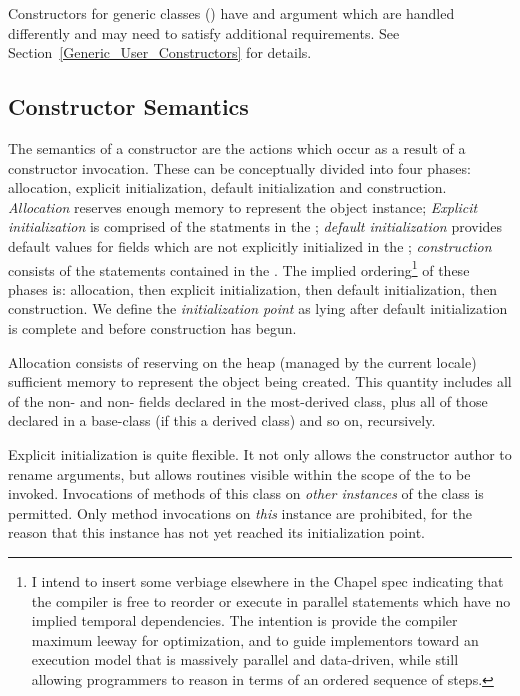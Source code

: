Constructors for generic classes () have 
and  argument which are handled differently and may need to satisfy
additional requirements. See Section~\ref{Generic_User_Constructors} for
details.  

\subsection{Constructor Semantics}
\label{Constructor_Semantics}

The semantics of a constructor are the actions which occur as a result of a
constructor invocation.  These can be conceptually divided
into four phases: allocation, explicit initialization, default initialization and
construction.  \emph{Allocation} reserves enough memory to represent the object
instance; \emph{Explicit initialization} is comprised of the statments in
the ; \emph{default initialization} provides
default values for fields which are not explicitly initialized in
the ; \emph{construction} consists of the
statements contained in the .  
The implied ordering\footnote{I intend to insert some verbiage elsewhere in the
Chapel spec indicating that the compiler is free to reorder or execute in
parallel statements which have no implied temporal dependencies.  The intention
is provide the compiler maximum leeway for optimization, and to guide
implementors toward an execution model that is massively parallel and
data-driven, while still allowing programmers to reason in terms of an ordered
sequence of steps.} of these phases is: allocation, then explicit
initialization, then default initialization, then construction.  We define the
\emph{initialization point} as lying after default initialization is complete and
before construction has begun.

Allocation consists of reserving on the heap (managed by the current locale)
sufficient memory to represent the object being created.  This quantity includes
all of the non- and non- fields declared in the
most-derived class, plus all of those declared in a base-class (if this
a derived class) and so on, recursively.


Explicit initialization is quite flexible.  It not only allows the constructor
author to rename arguments, but allows routines visible within the scope of
the  to be invoked.  Invocations of methods of this
class on \emph{other instances} of the class is permitted.  Only method
invocations on \emph{this} instance are prohibited, for the reason that this
instance has not yet reached its initialization point.

